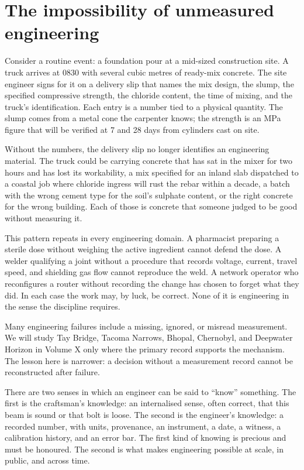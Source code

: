 

\section{The impossibility of unmeasured engineering}

Consider a routine event: a foundation pour at a mid-sized construction
site. A truck arrives at 0830 with several cubic metres of ready-mix
concrete. The site engineer signs for it on a delivery slip that names
the mix design, the slump, the specified compressive strength, the
chloride content, the time of mixing, and the truck's identification.
Each entry is a number tied to a physical quantity. The slump comes
from a metal cone the carpenter knows; the strength is an MPa figure
that will be verified at 7 and 28 days from cylinders cast on site.

Without the numbers, the delivery slip no longer identifies an
engineering material. The truck could be carrying concrete that has sat
in the mixer for two hours and has lost its workability, a mix specified
for an inland slab dispatched to a coastal job where chloride ingress
will rust the rebar within a decade, a batch with the wrong cement type
for the soil's sulphate content, or the right concrete for the wrong
building. Each of those is concrete that someone judged to be good
without measuring it.

This pattern repeats in every engineering domain. A pharmacist preparing
a sterile dose without weighing the active ingredient cannot defend the
dose. A welder qualifying a joint without a procedure that records
voltage, current, travel speed, and shielding gas flow cannot reproduce
the weld. A network operator who reconfigures a router without recording
the change has chosen to forget what they did. In each case the work
may, by luck, be correct. None of it is engineering in the sense the
discipline requires.

Many engineering failures include a missing, ignored, or misread
measurement. We will study Tay Bridge, Tacoma Narrows, Bhopal,
Chernobyl, and Deepwater Horizon in Volume X only where the primary
record supports the mechanism. The lesson here is narrower: a decision
without a measurement record cannot be reconstructed after failure.

There are two senses in which an engineer can be said to ``know''
something. The first is the craftsman's knowledge: an internalised
sense, often correct, that this beam is sound or that bolt is loose.
The second is the engineer's knowledge: a recorded number, with units,
provenance, an instrument, a date, a witness, a calibration history,
and an error bar. The first kind of knowing is precious and must be
honoured. The second is what makes engineering possible at scale, in
public, and across time.

